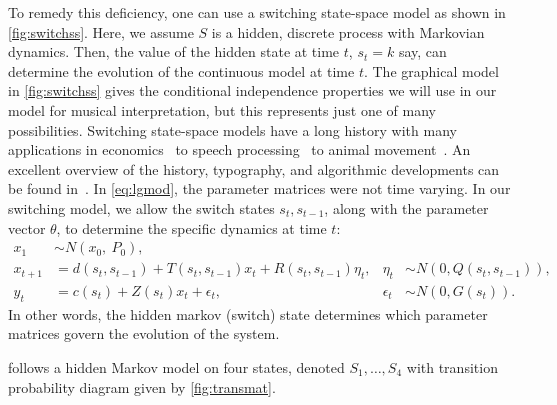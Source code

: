\documentclass[12pt]{article}
\begin{document}
To remedy this deficiency, one can use a switching state-space
model as shown in \autoref{fig:switchss}. Here, we assume $S$ is a
hidden, discrete process with Markovian dynamics. Then, the value of
the hidden state at time $t$, $s_t=k$ say, can determine the evolution of
the continuous model at time $t$. The graphical model in
\autoref{fig:switchss} gives the conditional independence properties
we will use in our model for musical interpretation, but this
represents just one of many possibilities. Switching state-space models have a long
history with many applications in 
economics~\citep{KimNelson1998,Kim1994,Hamilton2011} to speech
processing~\citep{FoxSudderth2011} to animal
movement~\citep{PattersonThomas2008,BlockJonsen2011}. An excellent
overview of the history, typography, and algorithmic developments can
be found in~\citep{GhahramaniHinton2000}. In \eqref{eq:lgmod}, the
parameter matrices were not time varying. In our switching model, we
allow the switch states $s_t, s_{t-1}$, along with the parameter
vector $\theta$, to determine the specific dynamics at time $t$:
\begin{equation}
  \begin{aligned}
    x_1 &\sim N(x_0,\ P_0),\\
    x_{t+1}&= d(s_{t},s_{t-1})+T(s_{t},s_{t-1}) x_t +
    R(s_{t},s_{t-1})\eta_{t}, 
    & \eta_t &\sim N(0,Q(s_{t},s_{t-1})),\\
    y_t&= c(s_t) + Z(s_t) x_t + \epsilon_t, & \epsilon_t &\sim N(0, G(s_t)).
  \end{aligned}
\end{equation}
In other words, the hidden markov (switch) state determines which parameter
matrices govern the evolution of the system. 





follows a hidden Markov model on
four states, denoted $S_1,\ldots,S_4$ with transition probability
diagram given by \autoref{fig:transmat}.
\end{document}
